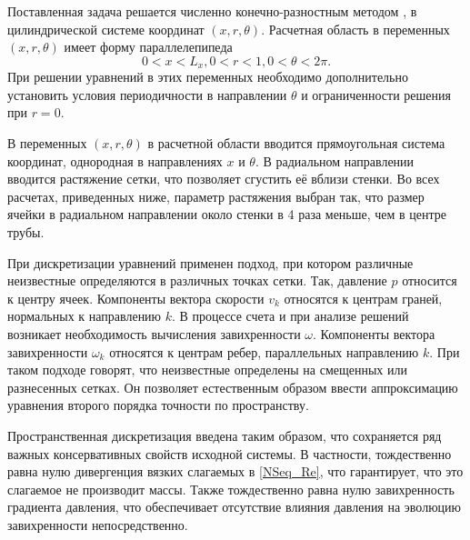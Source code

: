 Поставленная задача решается численно конечно-разностным методом \cite{nikitin2006method}, в цилиндрической системе координат $(x,r,\theta)$. Расчетная область в переменных $(x,r,\theta)$ имеет форму параллелепипеда
\begin{equation}
0 < x < L_x, 0 < r < 1, 0 < \theta < 2\pi.
\end{equation}
При решении уравнений в этих переменных необходимо дополнительно установить условия периодичности в направлении $\theta$ и ограниченности решения при $r=0$.

В переменных $(x,r,\theta)$ в расчетной области вводится прямоугольная система координат, однородная в направлениях $x$ и $\theta$. В радиальном направлении вводится растяжение сетки, что позволяет сгустить её вблизи стенки. Во всех расчетах, приведенных ниже, параметр растяжения выбран так, что размер ячейки в радиальном направлении около стенки в 4 раза меньше, чем в центре трубы. 

При дискретизации уравнений применен подход, при котором различные неизвестные определяются в различных точках сетки. Так, давление $p$ относится к центру ячеек. Компоненты вектора скорости $v_k$ относятся к центрам граней, нормальных к направлению $k$. В процессе счета и при анализе решений возникает необходимость вычисления завихренности $\omega$. Компоненты вектора завихренности $\omega_k$ относятся к центрам ребер, параллельных направлению $k$. При таком подходе говорят, что неизвестные определены на смещенных или разнесенных сетках. Он позволяет естественным образом ввести аппроксимацию уравнения второго порядка точности по пространству. 

Пространственная дискретизация введена таким образом, что сохраняется ряд важных консервативных свойств исходной системы. В частности, тождественно равна нулю дивергенция вязких слагаемых в \eqref{NSeq_Re}, что гарантирует, что это слагаемое не производит массы. Также тождественно равна нулю завихренность градиента давления, что обеспечивает отсутствие влияния давления на эволюцию завихренности непосредственно. 

